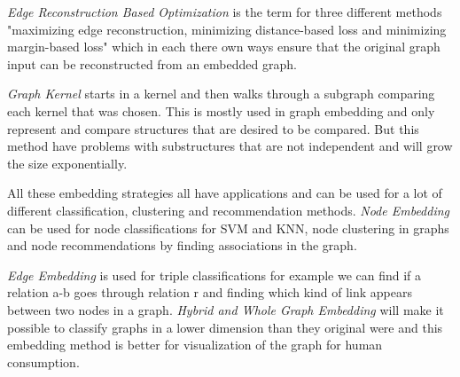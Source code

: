 \textit{Edge Reconstruction Based Optimization} is the term for three different methods "maximizing edge reconstruction, minimizing distance-based loss and minimizing margin-based loss" which in each there own ways ensure that the original graph input can be reconstructed from an embedded graph\cite{8294302}.

\textit{Graph Kernel} starts in a kernel and then walks through a subgraph comparing each kernel that was chosen. This is mostly used in graph embedding and only represent and compare structures that are desired to be compared. But this method have problems with substructures that are not independent and will grow the size exponentially\cite{8294302}.

All these embedding strategies all have applications and can be used for a lot of different classification, clustering and recommendation methods. \textit{Node Embedding} can be used for node classifications for SVM and KNN, node clustering in graphs and node recommendations by finding associations in the graph\cite{8294302}. 

\textit{Edge Embedding} is used for triple classifications for example we can find if a relation a-b goes through relation r and finding which kind of link appears between two nodes in a graph. \textit{Hybrid and Whole Graph Embedding} will make it possible to classify graphs in a lower dimension than they original were and this embedding method is better for visualization of the graph for human consumption\cite{8294302}.
